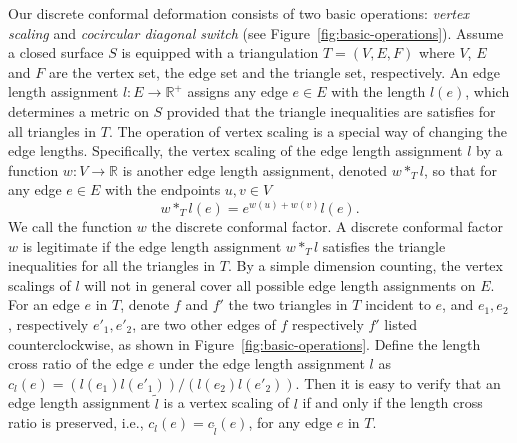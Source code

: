 \documentclass[11pt]{article}
\begin{document}
Our discrete conformal deformation consists of two basic operations:
{\it vertex scaling} and 
{\it cocircular diagonal switch} (see Figure~\ref{fig:basic-operations}). 
Assume a closed surface $S$ 
is equipped with a triangulation $T=(V, E, F)$ where $V$, $E$ and $F$ are the vertex set, 
the edge set and the triangle set, respectively. An edge length assignment
$l: E\rightarrow \mathbb{R}^+$ assigns any edge $e\in E$ with the length
$l(e)$, which determines a metric on $S$ provided that
the triangle inequalities are satisfies for all triangles in $T$. 
The operation of vertex scaling is a special way of changing the edge lengths. Specifically, 
the vertex scaling of the edge length assignment $l$ by a 
function $w: V\rightarrow \mathbb{R}$ is another edge length assignment, 
denoted $w *_T l$, so that for any edge $e\in E$ with the endpoints $u, v\in V$ 
\begin{equation}
w*_T l(e) = e^{w(u) + w(v)}l(e). 
\label{eq:vertexscaling}
\end{equation}
We call the function $w$ the discrete conformal factor. A discrete conformal factor $w$
is legitimate if the edge length assignment $w *_T l$ satisfies the triangle inequalities
for all the triangles in $T$. By a simple dimension counting,  the vertex scalings of $l$ 
will not in general cover all possible edge length assignments on $E$.
For an edge $e$ in $T$, 
denote $f$ and $f'$ the two triangles in $T$ incident to $e$, 
and $e_1, e_2$, respectively $e'_1, e'_2$, are two other edges of $f$ respectively $f'$ listed
counterclockwise, as shown in Figure~\ref{fig:basic-operations}. Define the length cross ratio
of the edge $e$ under the edge length assignment $l$ as $c_l(e) = (l(e_1)l(e'_1))/(l(e_2)l(e'_2))$. 
Then it is easy to verify that an edge length assignment $\tilde{l}$ is a vertex scaling of $l$ if 
and only if the length cross ratio is preserved, i.e., $c_l(e) = c_{\tilde{l}}(e)$, for any edge $e$ 
in $T$. 
\end{document}
